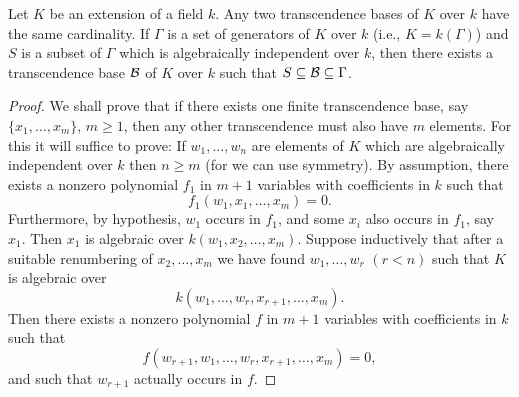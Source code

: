 \begin{theorem}
  Let \(K\) be an extension of a field \(k\). Any two transcendence bases of
  \(K\) over \(k\) have the same cardinality. If \(\Gamma\) is a set of
  generators of \(K\) over \(k\) (i.e., \(K=k(\Gamma)\)) and \(S\) is a
  subset of \(\Gamma\) which is algebraically independent over \(k\), then
  there exists a transcendence base \(\mathcal{B}\) of \(K\) over \(k\) such that
  \(S\subseteq\mathcal{B}\subseteq\Gamma\).
\end{theorem}
\begin{proof}
  We shall prove that if there exists one finite transcendence base, say
  \(\{x_1,\dotsc,x_m\}\), \(m\geq 1\), then any other transcendence must
  also have \(m\) elements. For this it will suffice to prove: If
  \(w_1,\dotsc,w_n\) are elements of \(K\) which are algebraically
  independent over \(k\) then \(n\geq m\) (for we can use symmetry). By
  assumption, there exists a nonzero polynomial \(f_1\) in \(m+1\)
  variables with coefficients in \(k\) such that
  \[
    f_1(w_1,x_1,\dotsc,x_m)=0.
  \]
  Furthermore, by hypothesis,  \(w_1\) occurs in \(f_1\), and some \(x_i\)
  also occurs in \(f_1\), say \(x_1\). Then \(x_1\) is algebraic over
  \(k(w_1,x_2,\dotsc,x_m)\). Suppose inductively that after a suitable
  renumbering of \(x_2,\dotsc,x_m\) we have found \(w_1,\dotsc,w_r\)
  \((r<n)\) such that \(K\) is algebraic over
  \[
    k(w_1,\dotsc,w_r,x_{r+1},\dotsc,x_m).
  \]
  Then there exists a nonzero polynomial \(f\) in \(m+1\) variables with
  coefficients in \(k\) such that
  \[
    f(w_{r+1},w_1,\dotsc,w_r,x_{r+1},\dotsc,x_m)=0,
  \]
  and such that \(w_{r+1}\) actually occurs in \(f\).
\end{proof}

